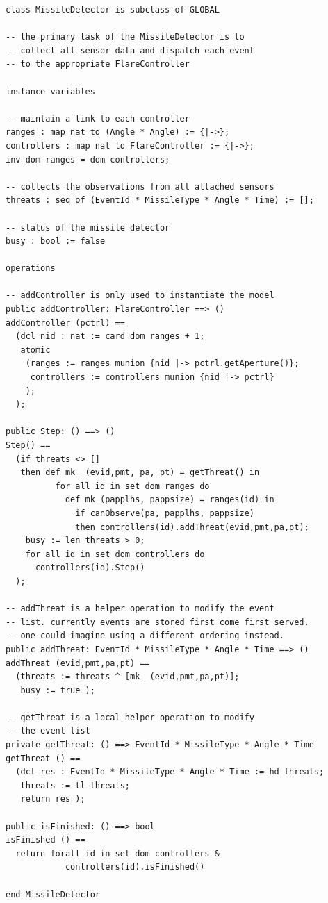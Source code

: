 \documentclass{overturerepchap}
\begin{document}
\begin{lstlisting}
class MissileDetector is subclass of GLOBAL

-- the primary task of the MissileDetector is to
-- collect all sensor data and dispatch each event
-- to the appropriate FlareController

instance variables

-- maintain a link to each controller
ranges : map nat to (Angle * Angle) := {|->};
controllers : map nat to FlareController := {|->};
inv dom ranges = dom controllers;

-- collects the observations from all attached sensors
threats : seq of (EventId * MissileType * Angle * Time) := [];

-- status of the missile detector
busy : bool := false

operations

-- addController is only used to instantiate the model
public addController: FlareController ==> ()
addController (pctrl) ==
  (dcl nid : nat := card dom ranges + 1;
   atomic
    (ranges := ranges munion {nid |-> pctrl.getAperture()};
     controllers := controllers munion {nid |-> pctrl}
    );
  );

public Step: () ==> ()
Step() ==
  (if threats <> []
   then def mk_ (evid,pmt, pa, pt) = getThreat() in
          for all id in set dom ranges do
            def mk_(papplhs, pappsize) = ranges(id) in
              if canObserve(pa, papplhs, pappsize)
              then controllers(id).addThreat(evid,pmt,pa,pt);
    busy := len threats > 0;
    for all id in set dom controllers do
      controllers(id).Step()
  );
 
-- addThreat is a helper operation to modify the event
-- list. currently events are stored first come first served.
-- one could imagine using a different ordering instead.
public addThreat: EventId * MissileType * Angle * Time ==> ()
addThreat (evid,pmt,pa,pt) == 
  (threats := threats ^ [mk_ (evid,pmt,pa,pt)];
   busy := true );

-- getThreat is a local helper operation to modify 
-- the event list
private getThreat: () ==> EventId * MissileType * Angle * Time
getThreat () ==
  (dcl res : EventId * MissileType * Angle * Time := hd threats;
   threats := tl threats;
   return res );

public isFinished: () ==> bool
isFinished () ==
  return forall id in set dom controllers &
            controllers(id).isFinished()

end MissileDetector
\end{lstlisting}
\end{document}
